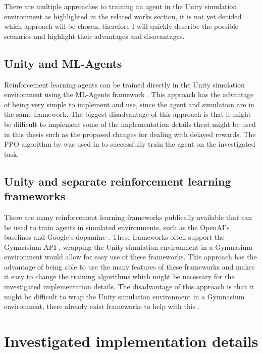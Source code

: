 There are multiple approaches to training an agent in the Unity simulation environment as highlighted in the related works section, it is not yet decided which approach will be chosen, therefore I will quickly describe the possible scenarios and highlight their advantages and disavantages.

\subsection*{Unity and ML-Agents}

Reinforcement learning agents can be trained directly in the Unity simulation environment using the ML-Agents framework \autocite{mlagents}. This approach has the advantage of being very simple to implement and use, since the agent and simulation are in the same framework. The biggest disadvantage of this approach is that it might be difficult to implement some of the implementation details theat might be used in this thesis such as the proposed changes for dealing with delayed rewards. 
The PPO algorithm by \autocite{mlagents} was used in \autocite{maximilian} to successfully train the agent on the investigated task.

\subsection*{Unity and separate reinforcement learning frameworks}

There are many reinforcement learning frameworks publically available that can be used to train agents in simulated environments, such as the OpenAI's baselines \autocite{sb3} and Google's dopamine \autocite{dopamine}. These frameworks often support the Gymnasium API \autocite{gymnasium}, wrapping the Unity simulation environment in a Gymnasium environment would allow for easy use of these frameworks. This approach has the advantage of being able to use the many features of these frameworks and makes it easy to change the training algorithms which might be necessary for the investigated implementation details. The disadvantage of this approach is that it might be difficult to wrap the Unity simulation environment in a Gymnasium environment, there already exist frameworks to help with this \autocite{peacefulpie}.




\section{Investigated implementation details}

